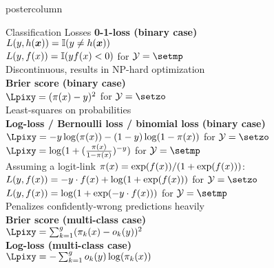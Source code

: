 \documentclass{beamer}
\begin{document}
\begin{frame}[fragile]{}
\begin{columns}
\begin{column}{.31\textwidth}
\begin{beamercolorbox}[center]{postercolumn}
\begin{minipage}{.98\textwidth}
{\begin{myblock}{Classification Losses}
\textbf{0-1-loss (binary case)}\\
$L (y, h(\bm{x})) = \mathbb{I}(y \neq h(\bm{x}))$\\
$L (y, f(x)) = \mathbb{I}( yf(x) < 0)$ for $\Yspace = \setmp$ \\ 
Discontinuous, results in NP-hard optimization\\

\textbf{Brier score (binary case)} \\
$\Lpixy = (\pix - y)^2$ for $\Yspace = \setzo$ \\
Least-squares on probabilities\\


\textbf{Log-loss / Bernoulli loss / binomial loss (binary case)}\\
$\Lpixy = -y \log(\pix) - (1-y) \log(1-\pix)$ for $\Yspace = \setzo$ \\
$\Lpixy = \log(1 + (\frac{\pix}{1-\pix})^{-y})$ for $\Yspace = \setmp$ \\

Assuming a logit-link $\pi(x) = \exp(f(x)) / ( 1+\exp(f(x)))$:\\
$L(y, f(x)) = -y \cdot f(x) + \log(1 + \exp(f(x)))$ for $\Yspace = \setzo$ \\
$L(y, f(x)) = \log(1 + \exp(- y \cdot f(x)))$ for $\Yspace = \setmp$ \\
Penalizes confidently-wrong predictions heavily\\

\textbf{Brier score (multi-class case)} \\
$\Lpixy =  \sumkg (\pikx - o_k(y))^2$ \\

\textbf{Log-loss (multi-class case)} \\
$ \Lpixy =  - \sumkg o_k(y) \log(\pikx)$ \\  %


\end{myblock}}
\end{minipage}
\end{beamercolorbox}
\end{column}
\end{columns}
\end{frame}
\end{document}
